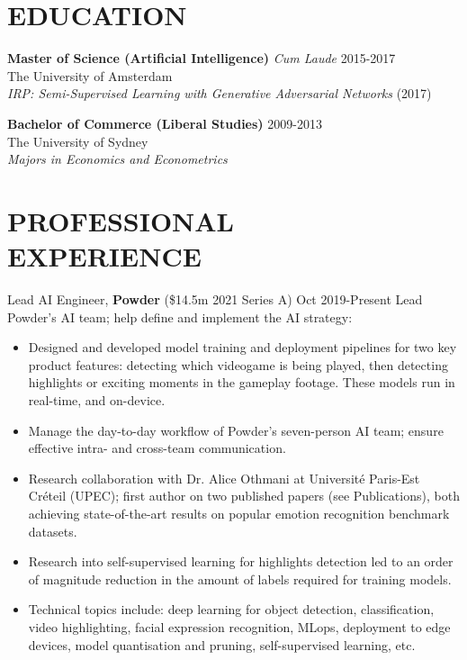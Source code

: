\documentclass[margin]{res}
\begin{document}
	\begin{resume}
		
		
		\section{EDUCATION} {\bf Master of Science (Artificial Intelligence)} {\sl Cum Laude} \hfill 2015-2017\\
		The University of Amsterdam\\
		{\sl IRP: Semi-Supervised Learning with Generative Adversarial Networks} (2017)
		
		{\bf Bachelor of Commerce (Liberal Studies)} \hfill 2009-2013\\
		The University of Sydney\\
		{\sl Majors in Economics and Econometrics}
		
		\section{PROFESSIONAL \\ EXPERIENCE}
		
		{Lead AI Engineer,} {\bf Powder} (\$14.5m 2021 Series A) \hfill Oct 2019-Present\vspace{2mm}\newline
        Lead Powder's AI team; help define and implement the AI strategy:
		\vspace{1mm}
		\begin{itemize}
			\item Designed and developed model training and deployment pipelines for two key product features: detecting which videogame is being played, then detecting highlights or exciting moments in the gameplay footage. These models run in real-time, and on-device.
			\item Manage the day-to-day workflow of Powder's seven-person AI team; ensure effective intra- and cross-team communication.
			\item Research collaboration with Dr.  Alice Othmani at Universit\'e Paris-Est Cr\'eteil (UPEC); first author on two published papers (see Publications), both achieving state-of-the-art results on popular emotion recognition benchmark datasets.
			\item Research into self-supervised learning for highlights detection led to an order of magnitude reduction in the amount of labels required for training models.
			\item Technical topics include: deep learning for object detection, classification, video highlighting, facial expression recognition, MLops, deployment to edge devices, model quantisation and pruning, self-supervised learning, etc.
		\end{itemize}
		

\end{resume}
\end{document}

